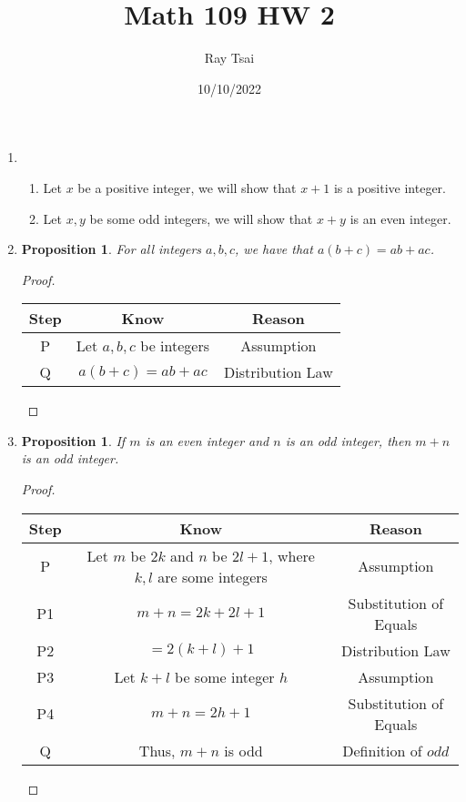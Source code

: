 \documentclass{article}
\title{Math 109 HW 2}
\author{Ray Tsai}
\date{10/10/2022}
\newtheorem{prop}[thm]{Proposition}
\begin{document}
 

\maketitle 

\begin{enumerate}
\item 
\begin{enumerate}
    \item
    Let $x$ be a positive integer, we will show that $x + 1$ is a positive integer.
    \item
    Let $x, y$ be some odd integers, we will show that $x + y$ is an even integer.
    
\end{enumerate}

\item \begin{prop}
    For all integers $a, b, c$, we have that $a(b+c) = ab+ac$.
    \end{prop}
    \begin{proof} \
    \begin{center}
    \begin{tabular}{|c|c|c|}
    \hline
    Step & Know & Reason \\ \hline
    P & Let $a, b, c$ be integers & Assumption \\ \hline
    Q & $a(b + c) = ab + ac$ & Distribution Law \\ \hline
\end{tabular}
\end{center}
\end{proof}

\item \begin{prop}
    If $m$ is an even integer and $n$ is an odd integer, then $m + n$ is an odd integer.
    \end{prop}
    \begin{proof} \
    \begin{center}
    \begin{tabular}{|c|c|c|}
    \hline
    Step & Know & Reason \\ \hline
    P & Let $m$ be $2k$ and $n$ be $2l + 1$, where $k, l$ are some integers & Assumption \\ \hline
    P1 & $m + n = 2k + 2l + 1$ & Substitution of Equals \\ \hline
    P2 & $= 2(k + l) + 1$ & Distribution Law \\ \hline
    P3 & Let $k + l$ be some integer $h$ & Assumption \\ \hline
    P4 & $m + n = 2h + 1$ & Substitution of Equals \\ \hline
    Q & Thus, $m + n$ is odd & Definition of $odd$ \\ \hline 
\end{tabular}
\end{center}
\end{proof} 


\end{enumerate}
\end{document}
